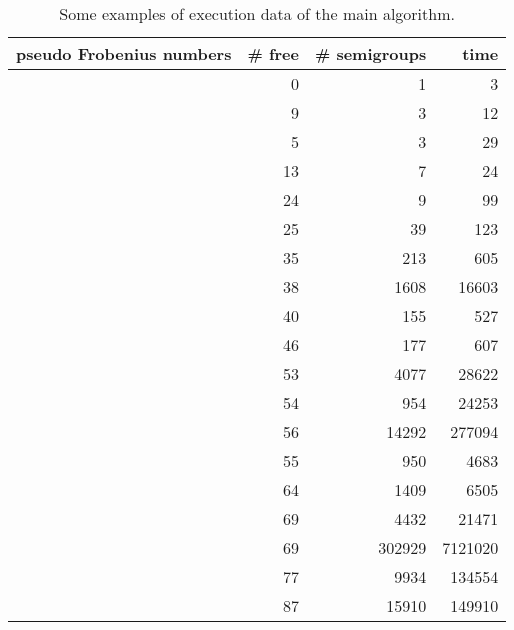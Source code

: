 \documentclass[11pt]{amsart}
\theoremstyle{remark}
\begin{document}
\begin{table}
\begin{center}
    \begin{tabular}{| l | r | r | r |}
    \hline
pseudo Frobenius numbers &\# free &\# semigroups & time\\ \hline
[ 15, 27, 31, 43, 47 ]& 0& 1 &3\\ \hline
[ 16, 30, 33, 37 ]& 9& 3 &12\\ \hline 
[ 40, 65, 80, 89, 107, 110, 130 ]& 5& 3 &29\\ \hline
[ 32, 35, 44, 45, 48 ]& 13& 7 &24\\ \hline
[ 40, 65, 89, 91, 100, 106 ]&24&9&99\\ \hline
[ 36, 50, 56, 57, 63 ]& 25& 39& 123\\ \hline
[ 43, 50, 52, 65 ]&35&213&605\\ \hline
[ 68, 71, 163, 196 ]&38&1608&16603\\ \hline 
[ 38, 57, 67, 74, 79 ]& 40& 155 &527\\ \hline
[ 68, 72, 76, 77 ]& 46& 177 &607\\ \hline
[ 62, 78, 99, 129, 130 ]& 53& 4077 &28622\\ \hline
[ 128, 131, 146, 151, 180, 216, 224, 267, 271, 287 ]& 54& 954 &24253\\ \hline 
[ 84, 103, 144, 202, 230, 242, 245 ]& 56& 14292& 277094\\ \hline 
[ 66, 85, 86, 92 ]&55&950&4683\\ \hline
[ 76, 79, 88, 102 ]&64&1409&6505\\ \hline
[ 61, 67, 94, 105 ]&69&4432&21471\\ \hline
[ 114, 150, 179, 182, 231, 236, 254, 321 ]& 69& 302929& 7121020\\ \hline 
[ 62, 73, 166, 190, 203 ]&77&9934&134554\\ \hline
[ 102, 104, 118, 123, 134, 146, 149 ]&87&15910&149910\\ \hline
   \end{tabular}
\end{center}
\caption{Some examples of execution data of the main algorithm.\label{fig:execution_time_main}}
\end{table}
\end{document}
